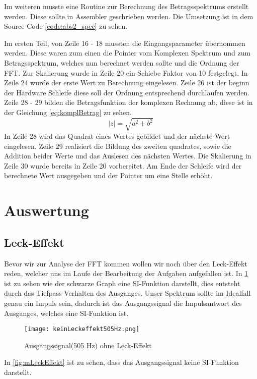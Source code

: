 Im weiteren musste eine Routine zur Berechnung des Betragsspektrums erstellt werden. Diese sollte in Assembler geschrieben werden. Die Umsetzung ist in dem Source-Code \autoref{code:abs2_spec} zu sehen.
\label{code:abs2_spec}

Im ersten Teil, von Zeile 16 - 18 mussten die Eingangsparameter übernommen werden. Diese waren zum einen  die Pointer vom Komplexen Spektrum und zum Betragsspektrum, welches nun berechnet werden sollte und die Ordnung der FFT.
Zur Skalierung wurde in Zeile 20 ein Schiebe Faktor von 10 festgelegt.
In Zeile 24 wurde der erste Wert zu Berechnung eingelesen. Zeile 26 ist der beginn der Hardware Schleife diese soll der Ordnung entsprechend durchlaufen werden. Zeile 28 - 29 bilden die Betragsfunktion der komplexen Rechnung ab, diese ist in der Gleichung \ref{eq:komplBetrag} zu sehen.
\begin{equation}
\label{eq:komplBetrag}
	\mid z \mid = \sqrt{a^2 + b^2}
\end{equation} 
In Zeile 28 wird das Quadrat eines Wertes gebildet und der nächste Wert eingelesen. 
Zeile 29 realisiert die Bildung des zweiten quadrates, sowie die Addition beider Werte und das Auslesen des nächsten Wertes. Die Skalierung in Zeile 30 wurde bereits in Zeile 20 vorbereitet.
Am Ende der Schleife wird der berechnete Wert ausgegeben und der Pointer um eine Stelle erhöht. 
\section{Auswertung}\label{AFFToF}
\subsection*{Leck-Effekt}
Bevor wir zur Analyse der FFT kommen wollen wir noch über den Leck-Effekt reden, welcher uns im Laufe der Bearbeitung der Aufgaben aufgefallen ist. In \cref{fig:oLeckEffekt} ist zu sehen wie der schwarze Graph eine SI-Funktion darstellt, dies entsteht durch das Tiefpass-Verhalten des Ausganges. Unser Spektrum sollte im Idealfall genau ein Impuls sein, dadurch ist das Ausgangssignal die Impulsantwort des Ausganges, welches eine SI-Funktion ist. 
\begin{figure}[H]
	\texttt{[image: keinLeckeffekt505Hz.png]}
  \caption{Ausgangssignal(505 Hz) ohne Leck-Effekt}
  \label{fig:oLeckEffekt}
\end{figure}
In \cref{fig:mLeckEffekt} ist zu sehen, dass das Ausgangssignal keine SI-Funktion darstellt.

